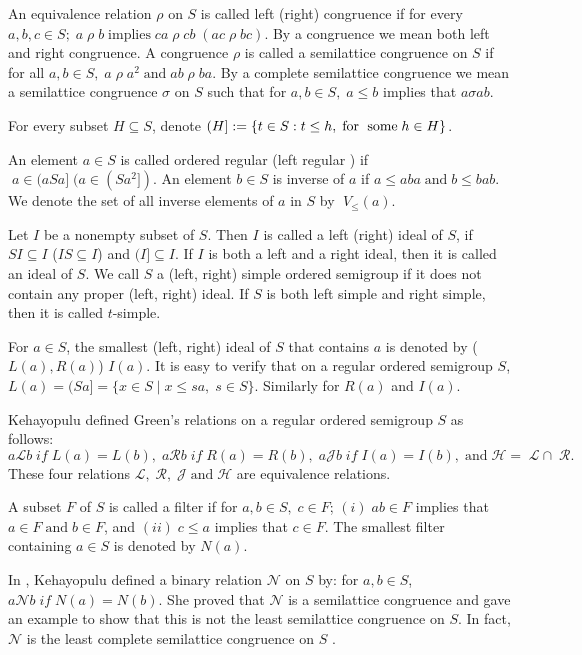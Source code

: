\documentclass[13pt]{article}
\theoremstyle{definition}
\theoremstyle{remark}
\numberwithin{equation}{section}
\newcommand{\lc}{\mathcal{L}}
\newcommand{\rc}{\mathcal{R}}
\newcommand{\hc}{\mathcal{H}}
\newcommand{\jc}{\mathcal{J}}
\newcommand{\ec}{\mathcal{N}}
\begin{document}
An equivalence relation $\rho$ on $S$ is called left (right)
congruence if for every $a, b, c \in S; \;a \;\rho \;b \;
\textrm{implies} \;ca \;\rho \;cb \;(ac \;\rho \;bc)$. By a
congruence we mean both left and right congruence. A congruence
$\rho$ is called a semilattice congruence on $S$ if for all $a, b
\in S, \;a \;\rho \;a^{2} \;\textrm{and} \;ab \;\rho \;ba$. By a
complete semilattice congruence we mean a semilattice congruence
$\sigma$ on $S$ such that for $a, b \in S, \;a \leq b$ implies that
$a \sigma ab$.

For every subset $H\subseteq S$, denote $(H] := \{t \in S : t \leq
h, \;\textrm{for \;some} \;h \in H \}$.


An element $a \in S$ is called  ordered regular \cite{ke91}(left
regular \cite{Ke1990}) if  $ \;a \in (aSa] \;(a \in (Sa^2])$.  An
element $b \in S$ is inverse of $a$ if $a \leq aba \;\textrm{and}
\;b \leq bab$. We denote the set of all inverse elements of $a$ in
$S$  by $ \;V_\leq(a)$.

Let $I$ be a nonempty subset of $S$. Then $I$ is called a left
(right) ideal of $S$, if $SI \subseteq I$ ($IS \subseteq I$) and
$(I] \subseteq I$. If $I$ is both a left and a right ideal, then it
is called an ideal of $S$. We call $S$ a (left, right) simple
ordered semigroup if it does not contain any proper (left, right)
ideal. If $S$ is both left simple and right simple, then it is
called $t$-simple.

For $a \in S$, the smallest (left, right) ideal of $S$ that contains
$a$ is denoted by ($L(a), R(a)$) $I(a)$. It is easy to verify that
on a regular ordered semigroup $S$, $ L(a) = (Sa] = \{x \in S \mid x
\leq sa, \; s \in S\}$. Similarly for $R(a)$ and $I(a)$.

Kehayopulu \cite{ke91} defined Green's relations on a regular
ordered semigroup $S$ as follows:
 $$ a \lc b   \; if   \;L(a)= L(b),  \;a \rc b   \; if   \;R(a)= R(b), \;a \jc b   \; if   \;I(a)= I(b), \;\textrm{and} \;\hc= \;\lc \cap
\;\rc.$$
 These four relations $\lc, \;\rc, \;\jc \;\textrm{and} \;\hc$ are
equivalence relations.

A subset $F$ of $S$ is called a filter if for $a,b \in S, \;c \in
F$; $(i) \;ab \in F$ implies that $a \in F \;\textrm{and} \;b \in
F$, and $(ii) \;c \leq a $ implies that $c \in F$.  The smallest
filter containing $a \in S$ is  denoted by $N(a)$.

In \cite{ke91}, Kehayopulu defined a binary relation $\ec$ on $S$
by: for $a, b \in S$,
 $a \ec b \; if \;N(a)=N(b)$.
She proved that $\ec$ is a semilattice congruence and gave an
example  \cite{ke91} to show that this is not the least semilattice
congruence on $S$. In fact, $\ec$ is the least complete semilattice
congruence on $S$ \cite{Gao1998}.
\end{document}
